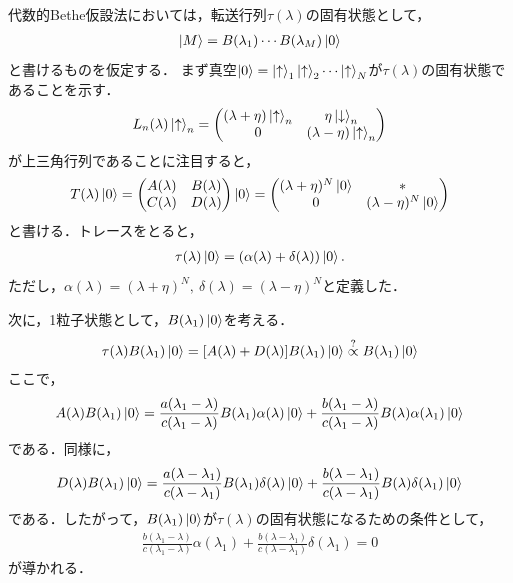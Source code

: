 \documentclass[\main/main.tex]{subfiles}
\begin{document}
\begin{frame}{}
    代数的Bethe仮設法においては，転送行列$\tau(\lambda)$の固有状態として，
    \begin{align}
        \ket{M} = B(\lambda_1)\cdots B(\lambda_M)\ket{0}
    \end{align}
    と書けるものを仮定する．
    まず真空$\ket{0} = \ket{\uparrow}_1 \ket{\uparrow}_2 \cdots \ket{\uparrow}_N$が$\tau(\lambda)$の固有状態であることを示す．
    \begin{align}
        L_n(\lambda)\ket{\uparrow}_n
        = \mqty(
            (\lambda+\eta)\ket{\uparrow}_n& \eta\ket{\downarrow}_n\\
            0&(\lambda-\eta)\ket{\uparrow}_n
            )
    \end{align}
    が上三角行列であることに注目すると，
    \begin{align}
        T(\lambda)\ket{0} = \mqty(A(\lambda)&B(\lambda)\\C(\lambda)&D(\lambda))\ket{0}
        = \mqty((\lambda+\eta)^N\ket{0}& * \\ 0 & (\lambda-\eta)^N\ket{0})
    \end{align}
    と書ける．トレースをとると，
    \begin{align}
        \tau(\lambda)\ket{0} = (\alpha(\lambda) + \delta(\lambda))\ket{0}.
    \end{align}
    ただし，$\alpha(\lambda) = (\lambda+\eta)^N,~ \delta(\lambda) = (\lambda-\eta)^N$と定義した．
\end{frame}

\begin{frame}{}
    次に，1粒子状態として，$B(\lambda_1)\ket{0}$を考える．
    \begin{align}
        \tau(\lambda)B(\lambda_1)\ket{0}
        = \qty[A(\lambda) + D(\lambda)]B(\lambda_1)\ket{0}
        \overset{?}{\propto} B(\lambda_1)\ket{0}
    \end{align}
    ここで，
    \begin{align}
        A(\lambda)B(\lambda_1)\ket{0}
        = \frac{a(\lambda_1-\lambda)}{c(\lambda_1-\lambda)}B(\lambda_1)\alpha(\lambda)\ket{0} + \frac{b(\lambda_1-\lambda)}{c(\lambda_1-\lambda)}B(\lambda)\alpha(\lambda_1)\ket{0}
    \end{align}
    である．同様に，
    \begin{align}
        D(\lambda)B(\lambda_1)\ket{0}
        = \frac{a(\lambda-\lambda_1)}{c(\lambda-\lambda_1)}B(\lambda_1)\delta(\lambda)\ket{0} + \frac{b(\lambda-\lambda_1)}{c(\lambda-\lambda_1)}B(\lambda)\delta(\lambda_1)\ket{0}
    \end{align}
    である．したがって，$B(\lambda_1)\ket{0}$が$\tau(\lambda)$の固有状態になるための条件として，
    \begin{align}
        \frac{b(\lambda_1-\lambda)}{c(\lambda_1-\lambda)}\alpha(\lambda_1) + \frac{b(\lambda-\lambda_1)}{c(\lambda-\lambda_1)}\delta(\lambda_1) = 0
        \label{ABA: 1particle BE}
    \end{align}
    が導かれる．
\end{frame}
\end{document}
